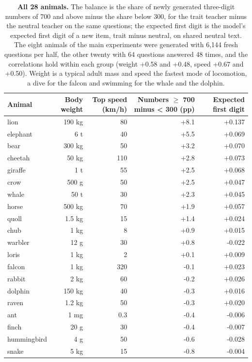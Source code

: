 \begin{table}[tp]
\caption{\textbf{All 28 animals.} The balance is the share of newly generated three-digit numbers of 700 and above minus the share below 300, for the trait teacher minus the neutral teacher on the same questions; the expected first digit is the model's expected first digit of a new item, trait minus neutral, on shared neutral text. The eight animals of the main experiments were generated with 6,144 fresh questions per half, the other twenty with 64 questions answered 48 times, and the correlations hold within each group (weight +0.58 and +0.48, speed +0.67 and +0.50). Weight is a typical adult mass and speed the fastest mode of locomotion, a dive for the falcon and swimming for the whale and the dolphin.}
\label{sitab:11}
{\tabsize\setlength{\tabcolsep}{4pt}
\begin{tabular}{@{}lrrrr@{}}
\toprule
\textbf{Animal} & \textbf{Body weight} & \textbf{Top speed (km/h)} & \textbf{Numbers $\geq$ 700 minus < 300 (pp)} & \textbf{Expected first digit}\\
\midrule
lion & 190 kg & 80 & +8.1 & +0.137\\
elephant & 6 t & 40 & +5.5 & +0.069\\
bear & 300 kg & 50 & +3.2 & +0.070\\
cheetah & 50 kg & 110 & +2.8 & +0.073\\
giraffe & 1 t & 55 & +2.5 & +0.068\\
crow & 500 g & 50 & +2.5 & +0.047\\
whale & 50 t & 30 & +2.3 & +0.045\\
horse & 500 kg & 70 & +1.9 & +0.057\\
quoll & 1.5 kg & 15 & +1.4 & +0.024\\
chub & 1 kg & 8 & +0.9 & +0.015\\
warbler & 12 g & 30 & +0.8 & -0.022\\
loris & 1 kg & 2 & +0.1 & +0.009\\
falcon & 1 kg & 320 & -0.1 & +0.023\\
rabbit & 2 kg & 60 & -0.2 & +0.026\\
dolphin & 150 kg & 40 & -0.3 & +0.016\\
raven & 1.2 kg & 50 & -0.3 & +0.020\\
ant & 1 mg & 0.3 & -0.4 & -0.006\\
finch & 20 g & 30 & -0.4 & -0.007\\
hummingbird & 4 g & 50 & -0.6 & -0.028\\
snake & 5 kg & 15 & -0.8 & -0.004\\

\end{tabular}}
\end{table}
